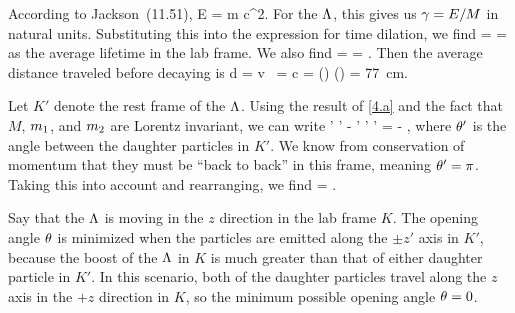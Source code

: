 \begin{solution}
	According to Jackson~(11.51),
	\beq
		E = \gam m c^2.
	\eeq
	For the $\Lambda$, this gives us $\gamma = E / M$ in natural units.  Substituting this into the expression for time dilation, we find
	\beq
		\Delt = \gam \tau
		=  \tau
	\eeq
	as the average lifetime in the lab frame.  We also find
	\beq
		\bet = 
		= .
	\eeq
	Then the average distance traveled before decaying is
	\beq
		d = v \,\Delt
		= c \tau {} 
		= (\lspeed)  \frac{\ELam}{\mLam} (\tauLam)
		= {\color{blue} \SI{77}{\cm}}.
	\eeq
	
	Let $K'$ denote the rest frame of the $\Lambda$.  Using the result of \ref{4.a} and the fact that $M$, $m_1$, and $m_2$ are Lorentz invariant, we can write
	\beqn \label{thing4}
		\Eq' \Ew' - \pq' \pw' \cos\tht' = \Eq \Ew - \pq \pw \cos\tht,
	\eeqn
	where $\theta'$ is the angle between the daughter particles in $K'$.  We know from conservation of momentum that they must be ``back to back'' in this frame, meaning $\theta' = \pi$.  Taking this into account and rearranging, we find
	\beqn \label{thing4.2}
		\cos\tht = .
	\eeqn

	Say that the $\Lambda$ is moving in the $z$ direction in the lab frame $K$.  The opening angle $\theta$ is minimized when the particles are emitted along the $\pm z'$ axis in $K'$, because the boost of the $\Lambda$ in $K$ is much greater than that of either daughter particle in $K'$.  In this scenario, both of the daughter particles travel along the $z$ axis in the $+z$ direction in $K$, so the minimum possible opening angle $\theta = 0$.
	

\end{solution}
